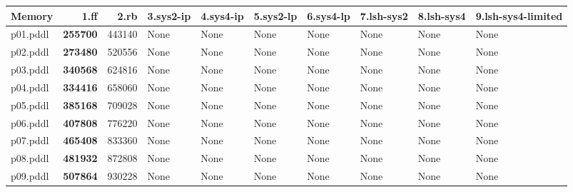 \documentclass{article}
\begin{document}
\begin{tabular}{@{}lrrrrrrrrr@{}}
Memory & 1.ff & 2.rb & 3.sys2-ip & 4.sys4-ip & 5.sys2-lp & 6.sys4-lp & 7.lsh-sys2 & 8.lsh-sys4 & 9.lsh-sys4-limited \\
\midrule
p01.pddl & \textbf{255700} & 443140 & \multicolumn{1}{|l|}{None} & \multicolumn{1}{|l|}{None} & \multicolumn{1}{|l|}{None} & \multicolumn{1}{|l|}{None} & \multicolumn{1}{|l|}{None} & \multicolumn{1}{|l|}{None} & \multicolumn{1}{|l|}{None} \\
p02.pddl & \textbf{273480} & 520556 & \multicolumn{1}{|l|}{None} & \multicolumn{1}{|l|}{None} & \multicolumn{1}{|l|}{None} & \multicolumn{1}{|l|}{None} & \multicolumn{1}{|l|}{None} & \multicolumn{1}{|l|}{None} & \multicolumn{1}{|l|}{None} \\
p03.pddl & \textbf{340568} & 624816 & \multicolumn{1}{|l|}{None} & \multicolumn{1}{|l|}{None} & \multicolumn{1}{|l|}{None} & \multicolumn{1}{|l|}{None} & \multicolumn{1}{|l|}{None} & \multicolumn{1}{|l|}{None} & \multicolumn{1}{|l|}{None} \\
p04.pddl & \textbf{334416} & 658060 & \multicolumn{1}{|l|}{None} & \multicolumn{1}{|l|}{None} & \multicolumn{1}{|l|}{None} & \multicolumn{1}{|l|}{None} & \multicolumn{1}{|l|}{None} & \multicolumn{1}{|l|}{None} & \multicolumn{1}{|l|}{None} \\
p05.pddl & \textbf{385168} & 709028 & \multicolumn{1}{|l|}{None} & \multicolumn{1}{|l|}{None} & \multicolumn{1}{|l|}{None} & \multicolumn{1}{|l|}{None} & \multicolumn{1}{|l|}{None} & \multicolumn{1}{|l|}{None} & \multicolumn{1}{|l|}{None} \\
p06.pddl & \textbf{407808} & 776220 & \multicolumn{1}{|l|}{None} & \multicolumn{1}{|l|}{None} & \multicolumn{1}{|l|}{None} & \multicolumn{1}{|l|}{None} & \multicolumn{1}{|l|}{None} & \multicolumn{1}{|l|}{None} & \multicolumn{1}{|l|}{None} \\
p07.pddl & \textbf{465408} & 833360 & \multicolumn{1}{|l|}{None} & \multicolumn{1}{|l|}{None} & \multicolumn{1}{|l|}{None} & \multicolumn{1}{|l|}{None} & \multicolumn{1}{|l|}{None} & \multicolumn{1}{|l|}{None} & \multicolumn{1}{|l|}{None} \\
p08.pddl & \textbf{481932} & 872808 & \multicolumn{1}{|l|}{None} & \multicolumn{1}{|l|}{None} & \multicolumn{1}{|l|}{None} & \multicolumn{1}{|l|}{None} & \multicolumn{1}{|l|}{None} & \multicolumn{1}{|l|}{None} & \multicolumn{1}{|l|}{None} \\
p09.pddl & \textbf{507864} & 930228 & \multicolumn{1}{|l|}{None} & \multicolumn{1}{|l|}{None} & \multicolumn{1}{|l|}{None} & \multicolumn{1}{|l|}{None} & \multicolumn{1}{|l|}{None} & \multicolumn{1}{|l|}{None} & \multicolumn{1}{|l|}{None} \\

\end{tabular}
\end{document}
